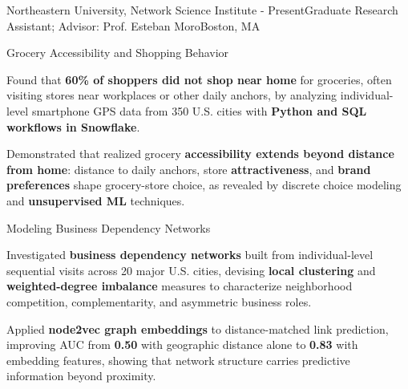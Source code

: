 \renewcommand{\timeInterval}{\DTMdisplaydate{2024}{9}{13}{-1} - Present}

\ifx\lang\eng
	\begin{rCVGroupedSubsection}{Northeastern University, Network Science Institute}{\timeInterval}{Graduate Research Assistant; Advisor: Prof. Esteban Moro}{Boston, MA}
		\begin{rExperienceSection}{Grocery Accessibility and Shopping Behavior}
		      \item Found that \textbf{60\% of shoppers did not shop near home} for groceries, often visiting stores near workplaces or other daily anchors, by analyzing individual-level smartphone GPS data from 350 U.S. cities with \textbf{Python and SQL workflows in Snowflake}.
		      \item Demonstrated that realized grocery \textbf{accessibility extends beyond distance from home}: distance to daily anchors, store \textbf{attractiveness}, and \textbf{brand preferences} shape grocery-store choice, as revealed by discrete choice modeling and \textbf{unsupervised ML} techniques.
		\end{rExperienceSection}
        \begin{rExperienceSection}{Modeling Business Dependency Networks}
            \item Investigated \textbf{business dependency networks} built from individual-level sequential visits across 20 major U.S. cities, devising \textbf{local clustering} and \textbf{weighted-degree imbalance} measures to characterize neighborhood competition, complementarity, and asymmetric business roles.
            \item Applied \textbf{node2vec graph embeddings} to distance-matched link prediction, improving AUC from \textbf{0.50} with geographic distance alone to \textbf{0.83} with embedding features, showing that network structure carries predictive information beyond proximity.
        \end{rExperienceSection}
	\end{rCVGroupedSubsection}
\else
\fi

\renewcommand{\timeInterval}{}
